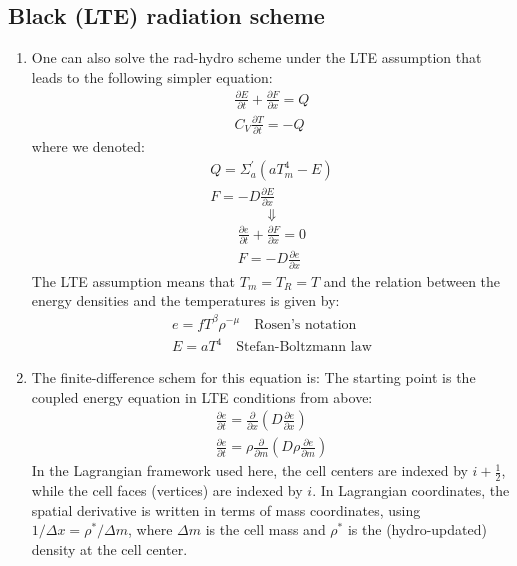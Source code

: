 \documentclass[11pt]{article}
\begin{document}
\subsection{Black (LTE) radiation scheme}
\begin{enumerate}
  \item One can also solve the rad-hydro scheme under the LTE assumption that leads to the following simpler equation:
  \begin{equation}
    \begin{aligned}
        \frac{\partial E}{\partial t} + \frac{\partial F}{\partial x} = Q \\
        C_V \frac{\partial T}{\partial t} = -Q
    \end{aligned}
  \end{equation}
  where we denoted:
  \begin{equation}
      \begin{gathered}
          Q = \Sigma_a^\prime (aT_m^4 - E) \\
          F = -D \frac{\partial E}{\partial x}
      \end{gathered}
  \end{equation}
  \begin{equation} \Downarrow \end{equation}
  \begin{equation}
    \begin{gathered}
    \frac{\partial e}{\partial t} + \frac{\partial F}{\partial x} = 0 \\
    F = -D \frac{\partial e}{\partial x}
    \end{gathered}
  \end{equation}
  The LTE assumption means that $T_m = T_R = T$ and the relation between the energy densities and the temperatures is given by:
  \begin{equation}
      \begin{aligned}
          e = f T^\beta \rho^{-\mu} \quad \text{Rosen's notation} \\
          E = a T^4 \quad \text{Stefan-Boltzmann law}
      \end{aligned}
  \end{equation}
  \item The finite-difference schem for this equation is:
  The starting point is the coupled energy equation in LTE conditions from above:
  \begin{equation}
    \begin{gathered}
    \frac{\partial e}{\partial t} = \frac{\partial}{\partial x}\left(D \frac{\partial e}{\partial x}\right) \\ 
    \frac{\partial e}{\partial t} = \rho \frac{\partial}{\partial m}\left(D \rho \frac{\partial e}{\partial m}\right)
    \end{gathered}
  \end{equation}
  In the Lagrangian framework used here, the cell centers are indexed by $i+\frac{1}{2}$, while the cell faces (vertices) are indexed by $i$. In Lagrangian coordinates, the spatial derivative is written in terms of mass coordinates, using $1/\Delta x = \rho^* / \Delta m$, where $\Delta m$ is the cell mass and $\rho^*$ is the (hydro-updated) density at the cell center.


\end{enumerate}
\end{document}
